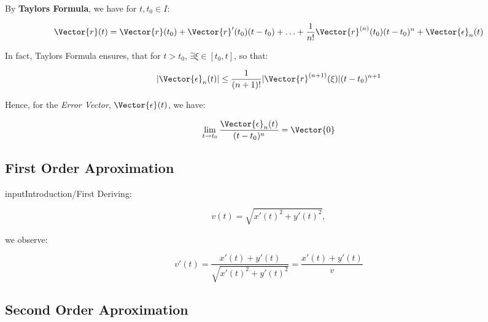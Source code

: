 
 By \textbf{Taylors Formula}, we have for $t,t_0 \in I$:
 
 \begin{equation}
 \label{eq:taylor:n}
  \Vector{r}(t)
  =
  \Vector{r}(t_0)
  +
  \Vector{r}'(t_0)(t-t_0)
  +
  \ldots+
  \frac{1}{n!} \Vector{r}^{(n)}(t_0)(t-t_0)^n
  +
  \Vector{\epsilon}_n(t)
 \end{equation}
 
 In fact, Taylors Formula ensures, that for $t>t_0$, $\exists \xi \in [t_0,t]$, so that:
 
 \[
   |\Vector{\epsilon}_n(t)|
   \leq 
   \frac{1}{(n+1)!}
   |\Vector{r}^{(n+1)}(\xi)|(t-t_0)^{n+1}
 \]
 
Hence, for the \emph{Error Vector}, $\Vector{\epsilon}(t)$, we have:
 
\begin{equation}
  \lim_{t\rightarrow t_0} \frac{\Vector{\epsilon}_n(t)}{ (t-t_0)^n }
 \label{eq:taylor:err:n}
  =
  \Vector{0}
\end{equation}
 
\subsection{First Order Aproximation}
input{Introduction/First}
Deriving:

\[
 v(t)=\sqrt{ x'(t)^2+y'(t)^2},
\]

we observe:

\[
  v'(t)
  =
  \frac{x'(t)+y'(t)}{ \sqrt{ x'(t)^2+y'(t)^2} }
  =
  \frac{x'(t)+y'(t)}{ v }
\]


\subsection{Second Order Aproximation}

 

 